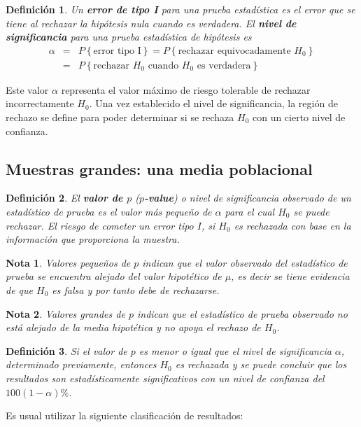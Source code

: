 \documentclass[a4paper]{report} %
\newtheorem{Def}{Definición}[chapter]
\newtheorem{Note}{Nota}[chapter]
\begin{document}
\begin{Def}
Un \textbf{error de tipo I} para una prueba estadística es el error que se tiene al rechazar la hipótesis nula cuando es verdadera. El \textbf{nivel de significancia} para una prueba estadística de hipótesis es
\begin{eqnarray*}
\alpha &=& P\left\{\textrm{error tipo I}\right\} = P\left\{\textrm{rechazar equivocadamente } H_{0}\right\} \\
&=& P\left\{\textrm{rechazar } H_{0} \textrm{ cuando } H_{0} \textrm{ es verdadera}\right\}
\end{eqnarray*}
\end{Def}
Este valor $\alpha$ representa el valor máximo de riesgo tolerable de rechazar incorrectamente $H_{0}$. Una vez establecido el nivel de significancia, la región de rechazo se define para poder determinar si se rechaza $H_{0}$ con un cierto nivel de confianza.

\subsection{Muestras grandes: una media poblacional}


\begin{Def}
El \textbf{valor de $p$} (\textbf{$p$-value}) o nivel de significancia observado de un estadístico de prueba es el valor más pequeño de $\alpha$ para el cual $H_{0}$ se puede rechazar. El riesgo de cometer un error tipo $I$, si $H_{0}$ es rechazada con base en la información que proporciona la muestra.
\end{Def}

\begin{Note}
Valores pequeños de $p$ indican que el valor observado del estadístico de prueba se encuentra alejado del valor hipotético de $\mu$, es decir se tiene evidencia de que $H_{0}$ es falsa y por tanto debe de rechazarse.
\end{Note}

\begin{Note}
Valores grandes de $p$ indican que el estadístico de prueba observado no está alejado de la media hipotética y no apoya el rechazo de $H_{0}$.
\end{Note}

\begin{Def}
Si el valor de $p$ es menor o igual que el nivel de significancia $\alpha$, determinado previamente, entonces $H_{0}$ es rechazada y se puede concluir que los resultados son estadísticamente significativos con un nivel de confianza del $100 (1-\alpha)\%$.
\end{Def}
Es usual utilizar la siguiente clasificación de resultados:
\end{document}
